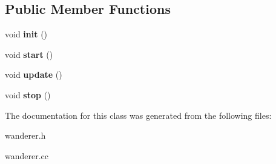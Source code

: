 \subsection*{Public Member Functions}
\begin{DoxyCompactItemize}
\item 
\mbox{\label{classWandererController_a602fa46c6de3bc7d1bd75f4cd6f6da84}} 
void {\bfseries init} ()
\item 
\mbox{\label{classWandererController_a8f1816ff2b3d3cab4a783406fd0dcb3f}} 
void {\bfseries start} ()
\item 
\mbox{\label{classWandererController_ad67334a5bf938e5d7f85a30ed27aea6a}} 
void {\bfseries update} ()
\item 
\mbox{\label{classWandererController_adbea5e2c52606bcc2eecf485edb72e65}} 
void {\bfseries stop} ()
\end{DoxyCompactItemize}


The documentation for this class was generated from the following files\+:\begin{DoxyCompactItemize}
\item 
wanderer.\+h\item 
wanderer.\+cc\end{DoxyCompactItemize}
